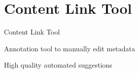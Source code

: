 \documentclass[10pt]{beamer}
\newcommand{\themename}{\textbf{\textsc{metropolis}}\xspace}
\begin{document}
\section{Content Link Tool}

\begin{frame}[fragile]{Content Link Tool}

  Annotation tool to manually edit metadata

  High quality automated suggestions

\end{frame}












\end{document}
